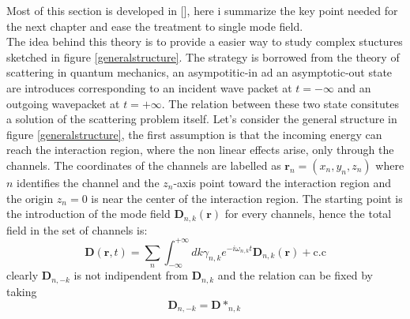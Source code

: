 \documentclass[12pt]{book}
\renewcommand{\r}{\mathbf{r}}
\begin{document}
Most of this section is developed in [], here i summarize the key point needed for the next chapter and ease the treatment to single mode field.\\ The idea behind this theory is to provide a easier way to study complex stuctures sketched in figure \ref{generalstructure}. The strategy is borrowed from the theory of scattering in quantum mechanics, an asympotitic-in ad an asymptotic-out state are introduces corresponding to an incident wave packet at $t = -\infty$ and an outgoing wavepacket at $t = +\infty$. The relation between these two state consitutes a solution of the scattering problem itself. Let's consider the general structure in figure \ref{generalstructure}, the first assumption is that the incoming energy can reach the interaction region, where the non linear effects arise, only through the channels. The coordinates of the channels are labelled as $\r_n = (x_n,y_n,z_n)$ where $n$ identifies the channel and the $z_n$-axis point toward the interaction region and the origin $z_n = 0$ is near the center of the interaction region. The starting point is the introduction of the mode field $\mathbf{D}_{n,k}(\r)$ for every channels, hence the total field in the set of channels is:
\begin{equation}\mathbf{D}(\r,t) = \sum_n\int_{-\infty}^{+\infty}dk \gamma_{n,k} e^{-i\omega_{n,k}t}\mathbf{D}_{n,k}(\r)  + \text{c.c}\end{equation}
clearly $\mathbf{D}_{n,-k}$ is not indipendent from $\mathbf{D}_{n,k}$ and the relation can be fixed by taking
\begin{equation}\label{ddstar}\mathbf{D}_{n,-k} = \mathbf{D}*_{n,k}\end{equation}
\end{document}
